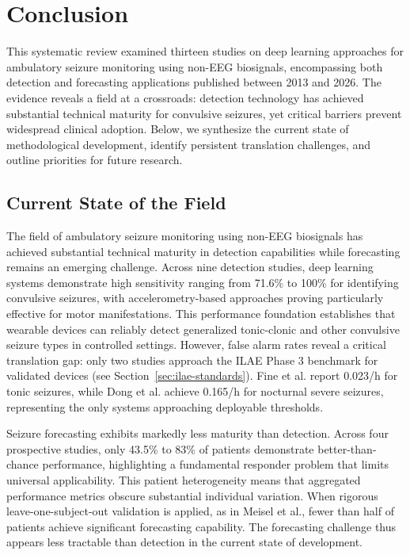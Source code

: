 \section{Conclusion}

This systematic review examined thirteen studies on deep learning approaches for ambulatory seizure monitoring using non-EEG biosignals, encompassing both detection and forecasting applications published between 2013 and 2026. The evidence reveals a field at a crossroads: detection technology has achieved substantial technical maturity for convulsive seizures, yet critical barriers prevent widespread clinical adoption. Below, we synthesize the current state of methodological development, identify persistent translation challenges, and outline priorities for future research.

\subsection{Current State of the Field}

The field of ambulatory seizure monitoring using non-EEG biosignals has achieved substantial technical maturity in detection capabilities while forecasting remains an emerging challenge. Across nine detection studies, deep learning systems demonstrate high sensitivity ranging from 71.6\% to 100\% for identifying convulsive seizures, with accelerometry-based approaches proving particularly effective for motor manifestations. This performance foundation establishes that wearable devices can reliably detect generalized tonic-clonic and other convulsive seizure types in controlled settings. However, false alarm rates reveal a critical translation gap: only two studies approach the ILAE Phase 3 benchmark for validated devices (see Section~\ref{sec:ilae-standards}). Fine et al. report 0.023/h for tonic seizures, while Dong et al. achieve 0.165/h for nocturnal severe seizures, representing the only systems approaching deployable thresholds.

Seizure forecasting exhibits markedly less maturity than detection. Across four prospective studies, only 43.5\% to 83\% of patients demonstrate better-than-chance performance, highlighting a fundamental responder problem that limits universal applicability. This patient heterogeneity means that aggregated performance metrics obscure substantial individual variation. When rigorous leave-one-subject-out validation is applied, as in Meisel et al., fewer than half of patients achieve significant forecasting capability. The forecasting challenge thus appears less tractable than detection in the current state of development.

